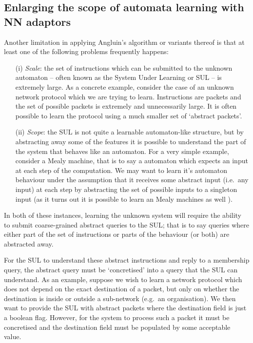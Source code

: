 \documentclass[11pt,a4paper]{article}
\begin{document}
		
		\subsection{Enlarging the scope of automata learning with NN adaptors}
		Another limitation in applying Angluin's algorithm or variants thereof is that at least one of the following problems frequently happens:
		\begin{itemize}
			\item[(i)] \emph{Scale}: the set of instructions which can be submitted to the unknown automaton -- often known as the System Under Learning or SUL -- is extremely large. As a concrete example, consider the case of an unknown network protocol which we are trying to learn. Instructions are packets and the set of possible packets is extremely and unnecessarily large. It is often possible to learn the protocol using a much smaller set of `abstract packets'.
			\item[(ii)] \emph{Scope}: the SUL is not quite a learnable automaton-like structure, but by abstracting away some of the features it is possible to understand the part of the system that behaves like an automaton. For a very simple example, consider a Mealy machine, that is to say a automaton which expects an input at each step of the computation. We may want to learn it's automaton behaviour under the assumption that it receives some abstract input (i.e.\ any input) at each step by abstracting the set of possible inputs to a singleton input (as it turns out it is possible to learn an Mealy machines as well \cite{}).
		\end{itemize}
		
		In both of these instances, learning the unknown system will require the ability to submit coarse-grained abstract queries to the SUL; that is to say queries where either part of the set of instructions or parts of the behaviour (or both) are abstracted away. 
		
		For the SUL to understand these abstract instructions and reply to a membership query, the abstract query must be `concretised' into a query that the SUL can understand.  As an example, suppose we wish to learn a network protocol which does not depend on the exact destination of a packet, but only on whether the destination is inside or outside a sub-network (e.g.\ an organisation). We then want to provide the SUL with abstract packets where the destination field is just a boolean flag. However, for the system to process such a packet it must be concretised and the destination field must be populated by some acceptable value.
		
\end{document}
